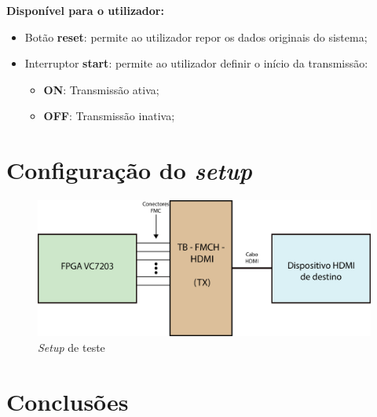 \documentclass[11pt,a4paper]{article}
\begin{document}
	\textbf{Disponível para o utilizador:}
	\begin{itemize}
		\item Botão \textbf{reset}: permite ao utilizador repor os dados originais do sistema;
		\item Interruptor \textbf{start}: permite ao utilizador definir o início da transmissão:
		\begin{itemize}
			\item \textbf{ON}: Transmissão ativa;
			\item \textbf{OFF}: Transmissão inativa;
		\end{itemize}
	\end{itemize}
	\section{Configuração do \textit{setup}}
	
		\begin{figure}[h!]
		\begin{center}
			\includegraphics[width=1.0\textwidth]{planAsch} 
			\caption{\textit{Setup} de teste}
		\end{center}
	\end{figure}

	\section{Conclusões}
	
\end{document}
